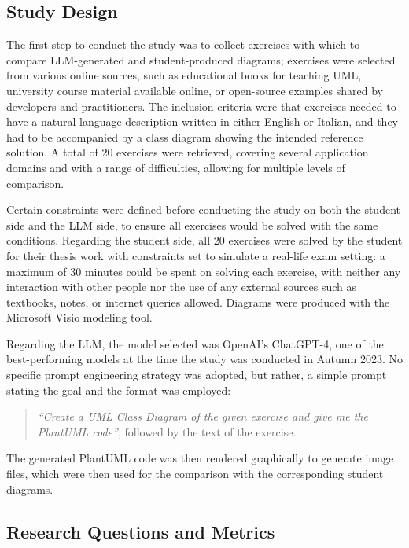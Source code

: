 \subsection{Study Design}
The first step to conduct the study was to collect exercises with which to compare LLM-generated and student-produced diagrams; exercises were selected from various online sources, such as educational books for teaching UML, university course material available online, or open-source examples shared by developers and practitioners. The inclusion criteria were that exercises needed to have a natural language description written in either English or Italian, and they had to be accompanied by a class diagram showing the intended reference solution. A total of 20 exercises were retrieved, covering several application domains and with a range of difficulties, allowing for multiple levels of comparison. 

Certain constraints were defined before conducting the study on both the student side and the LLM side, to ensure all exercises would be solved with the same conditions. Regarding the student side, all 20 exercises were solved by the student for their thesis work with constraints set to simulate a real-life exam setting: a maximum of 30 minutes could be spent on solving each exercise, with neither any interaction with other people nor the use of any external sources such as textbooks, notes, or internet queries allowed. Diagrams were produced with the Microsoft Visio modeling tool.

Regarding the LLM, the model selected was OpenAI's ChatGPT-4, one of the best-performing models at the time the study was conducted in Autumn 2023. No specific prompt engineering strategy was adopted, but rather, a simple prompt stating the goal and the format was employed:  

\begin{quote}
\textit{``Create a UML Class Diagram of the given exercise and give me the PlantUML code''}, followed by the text of the exercise.
\end{quote}

The generated PlantUML code was then rendered graphically to generate image files, which were then used for the comparison with the corresponding student diagrams.

\subsection{Research Questions and Metrics}

